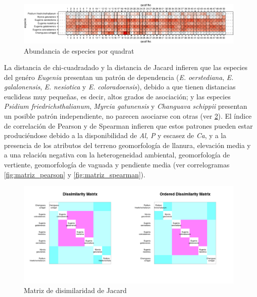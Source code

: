 \documentclass[11pt,]{article}
\begin{document}
\begin{figure}
\centering
\includegraphics{manuscrito_files/figure-latex/unnamed-chunk-3-1.pdf}
\caption{\label{fig:abun_sp_q}Abundancia de especies por quadrat}
\end{figure}

La distancia de chi-cuadradado y la distancia de Jacard infieren que las
especies del genéro \emph{Eugenia} presentan un patrón de dependencia
(\emph{E. oerstediana}, \emph{E. galalonensis}, \emph{E. nesiotica} y
\emph{E. coloradoensis}), debido a que tienen distancias euclideas muy
pequeñas, es decir, altos grados de asociación; y las especies
\emph{Psidium friedrichsthalianum}, \emph{Myrcia gatunensis} y
\emph{Changuava schippii} presentan un posible patrón independiente, no
parecen asociarse con otras (ver \ref{fig:matriz_Jacard}). El índice de
correlación de Pearson y de Spearman infieren que estos patrones pueden
estar produciéndose debido a la disponibilidad de \emph{Al, P} y escasez
de \emph{Ca}, y a la presencia de los atributos del terreno
geomorfología de llanura, elevación media y a una relación negativa con
la heterogeneidad ambiental, geomorfología de vertiente, geomorfología
de vaguada y pendiente media (ver correlogramas \ref{fig:matriz_pearson}
y \ref{fig:matriz_spearman}).

\begin{figure}
\centering
\includegraphics{Disimilaridad_.png}
\caption{Matriz de disimilaridad de Jacard \label{fig:matriz_Jacard}}
\end{figure}
\end{document}
